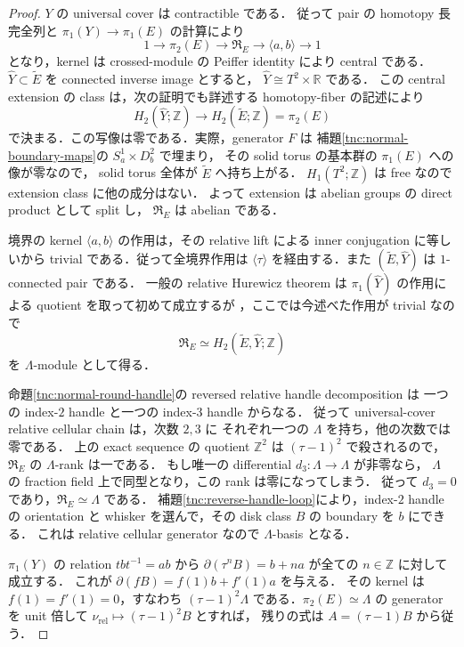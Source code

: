 \begin{proof}
$Y$ の universal cover は contractible である．
従って pair の homotopy 長完全列と
$\pi_1(Y)\to\pi_1(E)$ の計算により
\[
 1\longrightarrow\pi_2(E)\longrightarrow\mathfrak R_E
   \longrightarrow\langle a,b\rangle\longrightarrow1
\]
となり，kernel は crossed-module の Peiffer identity により central である．
$\widehat Y\subset\widetilde E$ を connected inverse image とすると，
$\widehat Y\cong T^2\times\mathbb R$ である．
この central extension の class は，次の証明でも詳述する
homotopy-fiber の記述により
\[
 H_2(\widehat Y;\mathbb Z)\longrightarrow
 H_2(\widetilde E;\mathbb Z)=\pi_2(E)
\]
で決まる．この写像は零である．実際，generator $F$ は
補題\ref{tnc:normal-boundary-maps}の $S^1_a\times D^2_b$ で埋まり，
その solid torus の基本群の $\pi_1(E)$ への像が零なので，
solid torus 全体が $\widetilde E$ へ持ち上がる．
$H_1(T^2;\mathbb Z)$ は free なので extension class に他の成分はない．
よって extension は abelian groups の direct product として split し，
$\mathfrak R_E$ は abelian である．

境界の kernel $\langle a,b\rangle$ の作用は，その relative lift による
inner conjugation に等しいから trivial である．従って全境界作用は
$\langle\tau\rangle$ を経由する．また
$(\widetilde E,\widehat Y)$ は $1$-connected pair である．
一般の relative Hurewicz theorem は
$\pi_1(\widehat Y)$ の作用による quotient を取って初めて成立するが
\cite[Theorem~4.37]{hatcher-bct}，ここでは今述べた作用が trivial なので
\[
 \mathfrak R_E\simeq H_2(\widetilde E,\widehat Y;\mathbb Z)
\]
を $\Lambda$-module として得る．

命題\ref{tnc:normal-round-handle}の reversed relative handle decomposition は
一つの index-$2$ handle と一つの index-$3$ handle からなる．
従って universal-cover relative cellular chain は，次数 $2,3$ に
それぞれ一つの $\Lambda$ を持ち，他の次数では零である．
上の exact sequence の quotient $\mathbb Z^2$ は
$(\tau-1)^2$ で殺されるので，$\mathfrak R_E$ の $\Lambda$-rank は一である．
もし唯一の differential $d_3:\Lambda\to\Lambda$ が非零なら，
$\Lambda$ の fraction field 上で同型となり，この rank は零になってしまう．
従って $d_3=0$ であり，$\mathfrak R_E\simeq\Lambda$ である．
補題\ref{tnc:reverse-handle-loop}により，index-$2$ handle の orientation と
whisker を選んで，その disk class $B$ の boundary を $b$ にできる．
これは relative cellular generator なので $\Lambda$-basis となる．

$\pi_1(Y)$ の relation $tbt^{-1}=ab$ から
$\partial(\tau^nB)=b+n a$ が全ての $n\in\mathbb Z$ に対して成立する．
これが $\partial(fB)=f(1)b+f'(1)a$ を与える．
その kernel は $f(1)=f'(1)=0$，すなわち
$(\tau-1)^2\Lambda$ である．$\pi_2(E)\simeq\Lambda$ の generator を
unit 倍して $\nu_{\mathrm{rel}}\mapsto(\tau-1)^2B$ とすれば，
残りの式は $A=(\tau-1)B$ から従う．
\end{proof}

